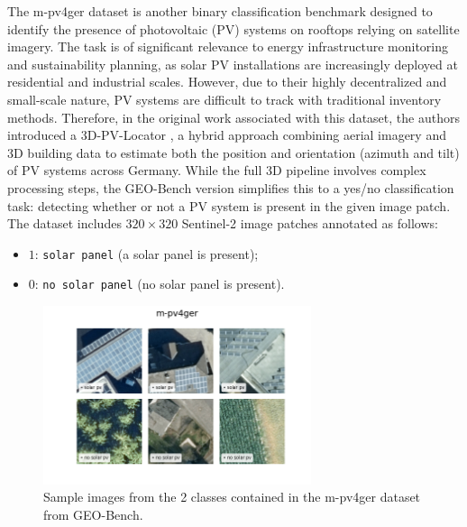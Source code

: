 \documentclass[a4paper, twoside, english]{sapthesis} %
\begin{document}
The m-pv4ger dataset is another binary classification benchmark designed to identify the presence of photovoltaic (PV) systems on rooftops relying on satellite imagery. The task is of significant relevance to energy infrastructure monitoring and sustainability planning, as solar PV installations are increasingly deployed at residential and industrial scales. However, due to their highly decentralized and small-scale nature, PV systems are difficult to track with traditional inventory methods. Therefore, in the original work associated with this dataset, the authors introduced a 3D-PV-Locator \cite{mayer20223d}, a hybrid approach combining aerial imagery and 3D building data to estimate both the position and orientation (azimuth and tilt) of PV systems across Germany. While the full 3D pipeline involves complex processing steps, the GEO-Bench version simplifies this to a yes/no classification task: detecting whether or not a PV system is present in the given image patch. The dataset includes $320\times 320$ Sentinel-2 image patches annotated as follows:

\begin{itemize}
    \item $1$: \texttt{solar panel} (a solar panel is present);
    \item $0$: \texttt{no solar panel} (no solar panel is present).
\end{itemize}


\begin{figure}[h]
    \centering
    \includegraphics[width=0.7\textwidth]{img/m-pv4ger_image_grid.png}
    \vspace{-0.5cm}
    \caption{\normalsize Sample images from the 2 classes contained in the m-pv4ger dataset from GEO-Bench.}
    \label{fig:solargrid}
\end{figure}
\end{document}
